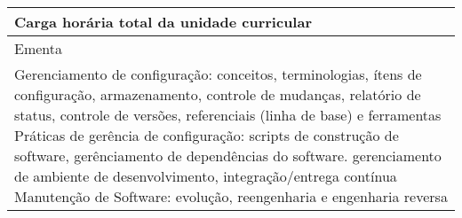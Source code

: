 \begin{quadro}[ht!]
\begin{tabular}{|p{3cm} p{2cm} p{3cm} p{2cm} p{3cm} p{2cm}|}
\multicolumn{5}{|p{13cm}|}{\cellcolor{blue1} Carga horária total da unidade curricular} & \multicolumn{1}{p{1cm}|}{\raggedleft 60	}\\\hline
\multicolumn{6}{|p{15cm}|}{\cellcolor{blue1} Ementa} \\\hline
\hline\multicolumn{6}{|p{15cm}|}{\scriptsize Gerenciamento de configuração: conceitos, terminologias, ítens de configuração, armazenamento, controle de mudanças, relatório de status, controle de versões, referenciais (linha de base) e ferramentas Práticas de gerência de configuração: scripts de construção de software, gerênciamento de dependências do software. gerenciamento de ambiente de desenvolvimento, integração/entrega contínua Manutenção de Software: evolução, reengenharia e engenharia reversa}\\\hline
\hline
	\end{tabular}
\end{quadro}
